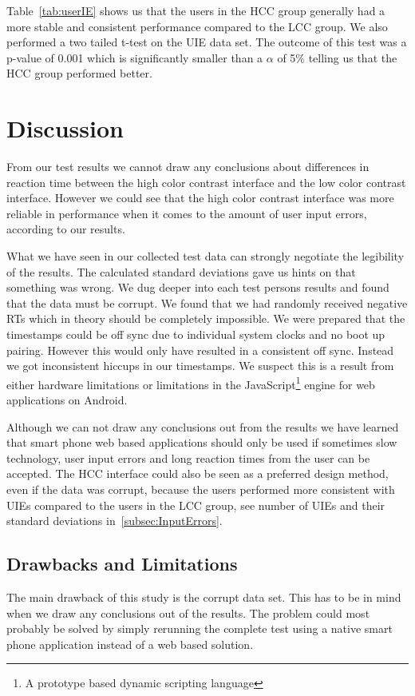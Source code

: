 \documentclass[runningheads,a4paper]{llncs}
\begin{document}
Table~\ref{tab:userIE} shows us that the users in the HCC group generally had a more stable and consistent performance compared to the LCC group. We also performed a two tailed t-test on the UIE data set. The outcome of this test was a p-value of 0.001 which is significantly smaller than a $\alpha$ of 5\% telling us that the HCC group performed better.

\section{Discussion}\label{sec:discussion}
From our test results we cannot draw any conclusions about differences in reaction time between the high color contrast interface and the low color contrast interface. However we could see that the high color contrast interface was more reliable in performance when it comes to the amount of user input errors, according to our results. 

What we have seen in our collected test data can strongly negotiate the legibility of the results. The calculated standard deviations gave us hints on that something was wrong. We dug deeper into each test persons results and found that the data must be corrupt. We found that we had randomly received negative RTs which in theory should be completely impossible. We were prepared that the timestamps could be off sync due to individual system clocks and no boot up pairing. However this would only have resulted in a consistent off sync. Instead we got inconsistent hiccups in our timestamps. We suspect this is a result from either hardware limitations or limitations in the JavaScript\footnote{A prototype based dynamic scripting language} engine for web applications on Android.

Although we can not draw any conclusions out from the results we have learned that smart phone web based applications should only be used if sometimes slow technology, user input errors and long reaction times from the user can be accepted. The HCC interface could also be seen as a preferred design method, even if the data was corrupt, because the users performed more consistent with UIEs compared to the users in the LCC group, see number of UIEs and their standard deviations in~\ref{subsec:InputErrors}.

\subsection{Drawbacks and Limitations}\label{subsec:drawbacks}
The main drawback of this study is the corrupt data set. This has to be in mind when we draw any conclusions out of the results. The problem could most probably be solved by simply rerunning the complete test using a native smart phone application instead of a web based solution.
\end{document}
